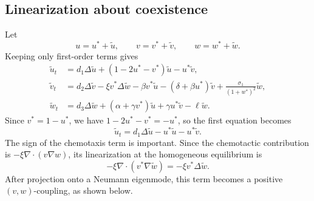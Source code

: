 \documentclass[a4paper,fleqn,longmktitle]{cas-sc}
\theoremstyle{plain}
\theoremstyle{definition}
\numberwithin{equation}{section}
\begin{document}
\subsection{Linearization about coexistence}
\label{app:rh-linearization}
Let
\[
u=u^*+\widetilde u,\qquad
v=v^*+\widetilde v,\qquad
w=w^*+\widetilde w .
\]
Keeping only first-order terms gives
\begin{equation}\label{eq:app-rh-linearized-system}
\begin{aligned}
\widetilde u_t
&=
d_1\Delta\widetilde u
+
(1-2u^*-v^*)\widetilde u
-u^*\widetilde v,\\
\widetilde v_t
&=
d_2\Delta\widetilde v
-\xi v^*\Delta\widetilde w
-\beta v^*\widetilde u
-(\delta+\beta u^*)\widetilde v
+\frac{\sigma_1}{(1+w^*)^2}\widetilde w,\\
\widetilde w_t
&=
d_3\Delta\widetilde w
+
(\alpha+\gamma v^*)\widetilde u
+\gamma u^*\widetilde v
-\ell\widetilde w .
\end{aligned}
\end{equation}
Since \(v^*=1-u^*\), we have $1-2u^*-v^*=-u^*$, so the first equation becomes
\[
\widetilde u_t
=
d_1\Delta\widetilde u-u^*\widetilde u-u^*\widetilde v .
\]
The sign of the chemotaxis term is important. Since the chemotactic contribution
is $-\xi\nabla\cdot(v\nabla w)$, its linearization at the homogeneous equilibrium
is
\[
-\xi\nabla\cdot(v^*\nabla\widetilde w)
=
-\xi v^*\Delta\widetilde w .
\]
After projection onto a Neumann eigenmode, this term becomes a positive
\((v,w)\)-coupling, as shown below.
\end{document}
